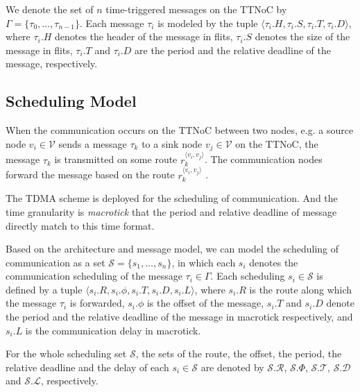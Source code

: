 \documentclass[10pt,journal]{IEEEtran}
\newcommand{\calV}{\mathcal{V}}
\newcommand{\calL}{\mathcal{L}}
\newcommand{\calS}{\mathcal{S}}
\newcommand{\calR}{\mathcal{R}}
\newcommand{\calD}{\mathcal{D}}
\newcommand{\calT}{\mathcal{T}}
\newcommand{\route}[3]{#1^{\langle #2,#3\rangle}}
\theoremstyle{remark}
\begin{document}
We denote the set of $n$ time-triggered messages on the TTNoC by $\Gamma = \{\tau_{0},\dots,\tau_{n-1}\}$. 
Each message $\tau_{i}$ is modeled by the tuple $\langle \tau_{i}.H,\tau_{i}.S, \tau_{i}.T,\tau_{i}.D\rangle$, 
 where $\tau_{i}.H$ denotes the header of the message in flits,
 $\tau_{i}.S$ denotes the size of the message in flits, 
 $\tau_{i}.T$ and $\tau_{i}.D$ are the period and the relative deadline of the message, respectively.
 
\subsection{Scheduling Model}
\label{ss:schmodel}

When the communication occurs on the TTNoC between two nodes,
 e.g. a source node $v_i\in \calV$ sends a message $\tau_{k}$ to a sink node $v_j\in \calV$ on the TTNoC,
  the message $\tau_k$ is transmitted on some route $\route{r_k}{v_i}{v_j}$. 
The communication nodes forward the message based on the route $\route{r_k}{v_i}{v_j}$ .

The TDMA scheme is deployed for the scheduling of communication.  
And the time granularity is \emph{macrotick} that the period and relative deadline of message directly match to this time format.

Based on the architecture and message model,
 we can model the scheduling of communication as a set $\calS=\{s_1,\ldots,s_n\}$,
  in which each $s_{i}$ denotes the communication scheduling of the message $\tau_{i}\in\Gamma$. 
Each scheduling $s_{i}\in\calS$ is defined by a tuple $\langle s_i.R, s_i.\phi, s_i.T, s_i.D, s_i.L\rangle$,
 where $s_i.R$ is the route along which the message $\tau_i$ is forwarded, 
 $s_i.\phi$ is the offset of the message,
  $s_i.T$ and
   $s_i.D$ denote the period and the relative deadline of the message in macrotick respectively,
    and $s_i.L$ is the communication delay in macrotick.

For the whole scheduling set $\calS$,
 the sets of the route,
 the offset,
  the period,
   the relative deadline and the delay of each $s_i\in\calS$ are denoted by $\calS.\calR$,
  $\calS.\Phi$,
   $\calS.\calT$,
    $\calS.\calD$ and $\calS.\calL$,
     respectively.

\end{document}
